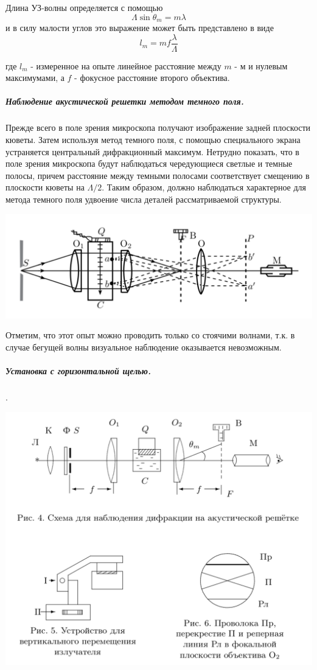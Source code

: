 \documentclass[12pt]{article}
\begin{document}
		Длина УЗ-волны определяется с помощью $$\Lambda\sin\theta_m = m\lambda$$ и в силу малости углов это выражение может быть представлено в виде 
		\begin{equation}\label{eq::for_uz_len}
		l_m = mf\dfrac{\lambda}{\Lambda}
		\end{equation}
		
		где $l_m$ - измеренное на опыте линейное расстояние между $m$ - м и нулевым максимумами, а $f$ - фокусное расстояние второго объектива.
		
		\subparagraph{Наблюдение акустической решетки методом темного поля.}
		
		Прежде всего в поле зрения микроскопа получают изображение задней плоскости кюветы. Затем используя метод темного поля, с помощью специального экрана устраняется центральный дифракционный максимум. Нетрудно показать, что в поле зрения микроскопа будут наблюдаться чередующиеся светлые и темные полосы, причем расстояние между темными полосами соответствует смещению в плоскости кюветы на $\Lambda / 2$. Таким образом, должно наблюдаться характерное для метода темного поля удвоение числа деталей рассматриваемой структуры. 
		\begin{center}
		\includegraphics[scale=.7]{second}
		\end{center}
		Отметим, что этот опыт можно проводить только со стоячими волнами, т.к. в случае бегущей волны визуальное наблюдение оказывается невозможным.
		
		\subparagraph{Установка с горизонтальной щелью.}
		.
		
		\begin{center}
		\includegraphics[scale=.6]{horizontal}
		\end{center}
	
\end{document}
